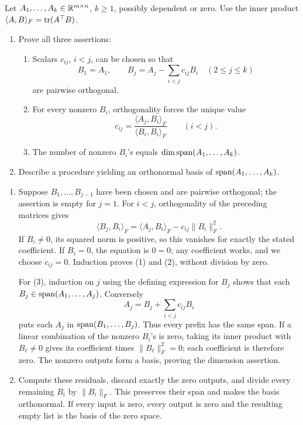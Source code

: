 \begin{problem}\label{ex:06:dependent-gs}
Let \(A_1,\ldots,A_k\in\mathbb R^{m\times n}\), \(k\geqslant1\), possibly
dependent or zero. Use the inner product
\(\langle A,B\rangle_F=\operatorname{tr}(A^\top B)\).
\begin{enumerate}
\item Prove all three assertions:
\begin{enumerate}[label=(\arabic*)]
\item Scalars \(c_{ij}\), \(i<j\), can be chosen so that
\[
B_1=A_1,\qquad B_j=A_j-\sum_{i<j}c_{ij}B_i
\quad(2\leqslant j\leqslant k)
\]
are pairwise orthogonal.
\item For every nonzero \(B_i\), orthogonality forces the unique value
\[
c_{ij}=\frac{\langle A_j,B_i\rangle_F}{\langle B_i,B_i\rangle_F}
\qquad(i<j).
\]
\item The number of nonzero \(B_i\)'s equals
\(\dim\operatorname{span}(A_1,\ldots,A_k)\).
\end{enumerate}
\item Describe a procedure yielding an orthonormal basis of
\(\operatorname{span}(A_1,\ldots,A_k)\).
\end{enumerate}
\end{problem}
\begin{solution}
\begin{enumerate}
\item Suppose \(B_1,\ldots,B_{j-1}\) have been chosen and are pairwise
orthogonal; the assertion is empty for \(j=1\).
For \(i<j\), orthogonality of the preceding matrices gives
\[
\langle B_j,B_i\rangle_F
=\langle A_j,B_i\rangle_F-c_{ij}\|B_i\|_F^2.
\]
If \(B_i\ne0\), its squared norm is positive, so this vanishes for
exactly the stated coefficient. If \(B_i=0\), the equation is \(0=0\);
any coefficient works, and we choose \(c_{ij}=0\).
Induction proves (1) and (2), without division by zero.

For (3), induction on \(j\) using the defining expression for \(B_j\)
shows that each \(B_j\in\operatorname{span}(A_1,\ldots,A_j)\).
Conversely
\[
A_j=B_j+\sum_{i<j}c_{ij}B_i
\]
puts each \(A_j\) in \(\operatorname{span}(B_1,\ldots,B_j)\).
Thus every prefix has the same span.
If a linear combination of the nonzero \(B_i\)'s is zero, taking its
inner product with \(B_\ell\ne0\) gives its coefficient times
\(\|B_\ell\|_F^2=0\); each coefficient is therefore zero.
The nonzero outputs form a basis, proving the dimension assertion.
\item Compute these residuals, discard exactly the zero outputs, and
divide every remaining \(B_i\) by \(\|B_i\|_F\).
This preserves their span and makes the basis orthonormal.
If every input is zero, every output is zero and the resulting empty
list is the basis of the zero space.
\end{enumerate}
\end{solution}

